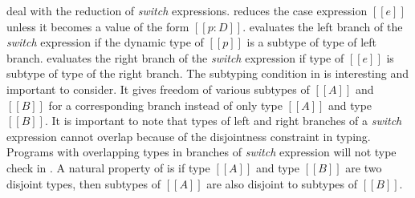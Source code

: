 \begin{comment}
\Rref{step-beta} deals with a special case, that occurs when the
argument of a function is a non-annotatted lambda expression.
With bi-directional type-checking an expression such as:
($[[\f.f 1:(Int -> Int -> Int) : (Int -> Int -> Int)]]$)($[[\x.x]]$)
\bruno{example here.} \baber{Done.}
is well-typed, since bi-directional type-checking propagates
type information to the arguments. Thus, the dynamic semantics
needs to deal with such programs.
We emphasize the fact that $[[\x.e]]$ is not a value in \cal.
The rule follows the same approach as
\rref{step-beta} except that both of the input types are kept with
$[[\x.e]]$ during substitution i.e $[[\x.e:A2:A1]]$. \Rref{step-ann}
reduces an annotated expression only if it is not a value and $[[e]]$
reduces to some $[[e']]$. \Rref{step-rmann} drops inner
annotations. \Rref{step-lamann} adds one more type annotation with
lambda expressions having single type annotation to make them values.
\end{comment}

 deal with the reduction
of \emph{switch} expressions.
 reduces the case expression $[[e]]$ unless it
becomes a value of the form $[[p:D]]$.  
 evaluates
the left branch of the \emph{switch} expression if the dynamic type of $[[p]]$ is
a subtype of type of left branch.   evaluates the right
branch of the \emph{switch} expression if type of $[[e]]$ is subtype
of type of the right branch. The subtyping condition in  is interesting and important to consider. It gives
freedom of various subtypes of $[[A]]$ and $[[B]]$ for a corresponding
branch instead of only type $[[A]]$ and type $[[B]]$. It is important
to note that types of left and right branches of a \emph{switch}
expression cannot overlap because of the disjointness constraint in
typing. 
Programs with overlapping types in branches of \emph{switch}
expression will not type check in \cal.
A natural property of \cal is
if type $[[A]]$ and type $[[B]]$ are two disjoint types, then subtypes
of $[[A]]$ are also disjoint to subtypes of $[[B]]$.

